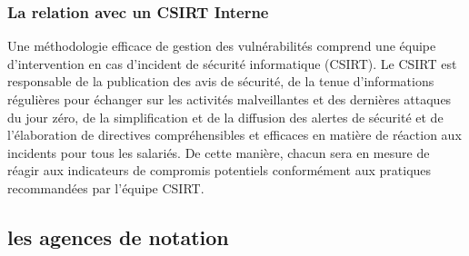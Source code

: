 \subsubsection{La relation avec un CSIRT Interne }

	Une méthodologie efficace de gestion des vulnérabilités comprend une équipe d’intervention en cas d’incident de sécurité informatique (CSIRT). Le CSIRT est responsable de la publication des avis de sécurité, de la tenue d'informations régulières pour échanger sur les activités malveillantes et des dernières attaques du jour zéro, de la simplification et de la diffusion des alertes de sécurité et de l’élaboration de directives compréhensibles et efficaces en matière de réaction aux incidents pour tous les salariés. De cette manière, chacun sera en mesure de réagir aux indicateurs de compromis potentiels conformément aux pratiques recommandées par l'équipe CSIRT.
	
	
\subsection{les agences de notation}


\utodo